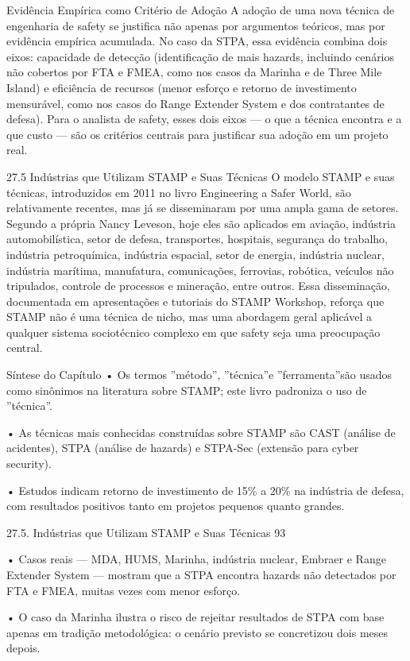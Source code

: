 Evidência Empírica como Critério de Adoção A adoção de uma nova técnica de engenharia de safety se justifica não apenas por argumentos teóricos, mas por evidência empírica acumulada. No caso da STPA, essa evidência combina dois eixos: capacidade de detecção (identificação de mais hazards, incluindo cenários não cobertos por FTA e FMEA, como nos casos da Marinha e de Three Mile Island) e eficiência de recursos (menor esforço e retorno de investimento mensurável, como nos casos do Range Extender System e dos contratantes de defesa). Para o analista de safety, esses dois eixos — o que a técnica encontra e a que custo — são os critérios centrais para justificar sua adoção em um projeto real.

27.5 Indústrias que Utilizam STAMP e Suas Técnicas O modelo STAMP e suas técnicas, introduzidos em 2011 no livro Engineering a Safer World, são relativamente recentes, mas já se disseminaram por uma ampla gama de setores. Segundo a própria Nancy Leveson, hoje eles são aplicados em aviação, indústria automobilística, setor de defesa, transportes, hospitais, segurança do trabalho, indústria petroquímica, indústria espacial, setor de energia, indústria nuclear, indústria marítima, manufatura, comunicações, ferrovias, robótica, veículos não tripulados, controle de processos e mineração, entre outros. Essa disseminação, documentada em apresentações e tutoriais do STAMP Workshop, reforça que STAMP não é uma técnica de nicho, mas uma abordagem geral aplicável a qualquer sistema sociotécnico complexo em que safety seja uma preocupação central.

Síntese do Capítulo • Os termos ”método”, ”técnica”e ”ferramenta”são usados como sinônimos na literatura sobre STAMP; este livro padroniza o uso de ”técnica”.

• As técnicas mais conhecidas construídas sobre STAMP são CAST (análise de acidentes), STPA (análise de hazards) e STPA-Sec (extensão para cyber security).

• Estudos indicam retorno de investimento de 15\% a 20\% na indústria de defesa, com resultados positivos tanto em projetos pequenos quanto grandes.

27.5. Indústrias que Utilizam STAMP e Suas Técnicas 93

• Casos reais — MDA, HUMS, Marinha, indústria nuclear, Embraer e Range Extender System — mostram que a STPA encontra hazards não detectados por FTA e FMEA, muitas vezes com menor esforço.

• O caso da Marinha ilustra o risco de rejeitar resultados de STPA com base apenas em tradição metodológica: o cenário previsto se concretizou dois meses depois.

